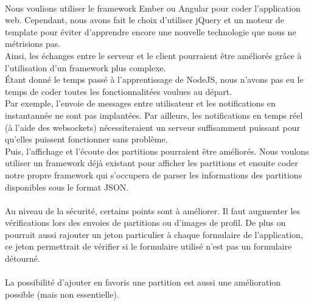 \paragraph{}
Nous voulions utiliser le framework Ember ou Angular pour coder l'application web. Cependant, nous avons fait le choix d'utiliser jQuery et un moteur de template pour éviter d'apprendre encore une nouvelle technologie que nous ne métrisions pas. \\
Ainsi, les échanges entre le serveur et le client pourraient être améliorés grâce à l'utilisation d'un framework plus complexe. \\
Étant donné le temps passé à l'apprentissage de NodeJS, nous n'avons pas eu le temps de coder toutes les fonctionnalitées voulues au départ. \\
Par exemple, l'envoie de messages entre utilisateur et les notifications en instantannée ne sont pas implantées. Par ailleurs, les notifications en temps réel (à l'aide des websockets) nécessiteraient un serveur suffisamment puissant pour qu'elles puissent fonctionner sans problème. \\
Puis, l'affichage et l'écoute des partitions pourraient être améliorés.
Nous voulons utiliser un framework déjà existant pour afficher les partitions et ensuite coder notre propre framework qui s'occupera de parser les informations des partitions disponibles sous le format JSON. \\
\paragraph{}
Au niveau de la sécurité, certains points sont à améliorer. Il faut augmenter les vérifications lors des envoies de partitions ou d'images de profil. De plus on pourrait aussi rajouter un jeton particulier à chaque formulaire de l'application, ce jeton permettrait de vérifier si le formulaire utilisé n'est pas un formulaire détourné.
\paragraph{}
La possibilité d'ajouter en favoris une partition est aussi une amélioration possible (mais non essentielle).

